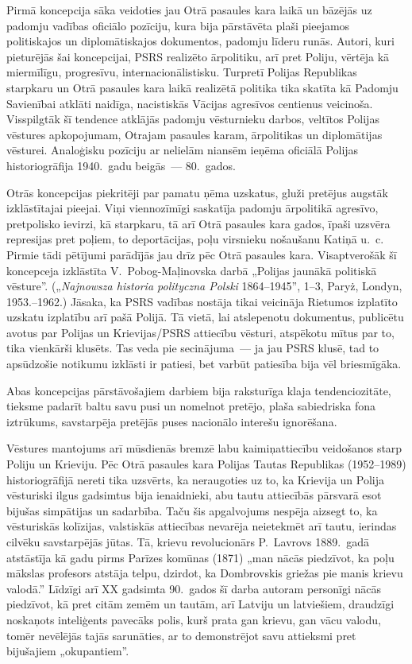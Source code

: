 \documentclass[twoside,a5paper,12pt,fleqn,openany]{extbook}
\newcommand{\pltxti}[1]{\textit{\textpolish{#1}}}
\begin{document}
Pirmā koncepcija sāka veidoties jau Otrā pasaules kara laikā un bāzējās uz padomju vadības oficiālo pozīciju, kura bija pārstāvēta plaši pieejamos politiskajos un diplomātiskajos dokumentos, padomju līderu runās. Autori, kuri pieturējās šai koncepcijai, PSRS realizēto ārpolitiku, arī pret Poliju, vērtēja kā miermīlīgu, progresīvu, internacionālistisku. Turpretī Polijas Republikas starpkaru un Otrā pasaules kara laikā realizētā politika tika skatīta kā Padomju Savienībai atklāti naidīga, nacistiskās Vācijas agresīvos centienus veicinoša. Visspilgtāk šī tendence atklājās padomju vēsturnieku darbos, veltītos Polijas vēstures apkopojumam, Otrajam pasaules karam, ārpolitikas un diplomātijas vēsturei. Analoģisku pozīciju ar nelielām niansēm ieņēma oficiālā Polijas historiogrāfija 1940.~gadu beigās~--- 80.~gados.

Otrās koncepcijas piekritēji par pamatu ņēma uzskatus, gluži pretējus augstāk izklāstītajai pieejai. Viņi viennozīmīgi saskatīja padomju ārpolitikā agresīvo, pretpolisko ievirzi, kā starpkaru, tā arī Otrā pasaules kara gados, īpaši uzsvēra represijas pret poļiem, to deportācijas, poļu virsnieku nošaušanu Katiņā u.~c. Pirmie tādi pētījumi parādījās jau drīz pēc Otrā pasaules kara. Visaptverošāk šī koncepceja izklāstīta V.~Pobog-Maļinovska darbā „Polijas jaunākā politiskā vēsture”. („\pltxti{Najnowsza historia polityczna Polski} 1864--1945”, 1--3, Paryż, Londyn, 1953.--1962.) Jāsaka, ka PSRS vadības nostāja tikai veicināja Rietumos izplatīto uzskatu izplatību arī pašā Polijā. Tā vietā, lai atslepenotu dokumentus, publicētu avotus par Polijas un Krievijas/PSRS attiecību vēsturi, atspēkotu mītus par to, tika vienkārši klusēts. Tas veda pie secinājuma~--- ja jau PSRS klusē, tad to apsūdzošie notikumu izklāsti ir patiesi, bet varbūt patiesība bija vēl briesmīgāka.

Abas koncepcijas pārstāvošajiem darbiem bija raksturīga klaja tendenciozitāte, tieksme padarīt baltu savu pusi un nomelnot pretējo, plaša sabiedriska fona iztrūkums, savstarpēja pretējās puses nacionālo interešu ignorēšana.

Vēstures mantojums arī mūsdienās bremzē labu kaimiņattiecību veidošanos starp Poliju un Krieviju. Pēc Otrā pasaules kara Polijas Tautas Republikas (1952--1989) historiogrāfijā nereti tika uzsvērts, ka neraugoties uz to, ka Krievija un Polija vēsturiski ilgus gadsimtus bija ienaidnieki, abu tautu attiecībās pārsvarā esot bijušas simpātijas un sadarbība. Taču šis apgalvojums nespēja aizsegt to, ka vēsturiskās kolīzijas, valstiskās attiecības nevarēja neietekmēt arī tautu, ierindas cilvēku savstarpējās jūtas. Tā, krievu revolucionārs P.~Lavrovs 1889.~gadā atstāstīja kā gadu pirms Parīzes komūnas (1871) „man nācās piedzīvot, ka poļu mākslas profesors atstāja telpu, dzirdot, ka Dombrovskis griežas pie manis krievu valodā.” Līdzīgi arī XX gadsimta 90.~gados šī darba autoram personīgi nācās piedzīvot, kā pret citām zemēm un tautām, arī Latviju un latviešiem, draudzīgi noskaņots inteliģents pavecāks polis, kurš prata gan krievu, gan vācu valodu, tomēr nevēlējās tajās sarunāties, ar to demonstrējot savu attieksmi pret bijušajiem „okupantiem”.
\end{document}

